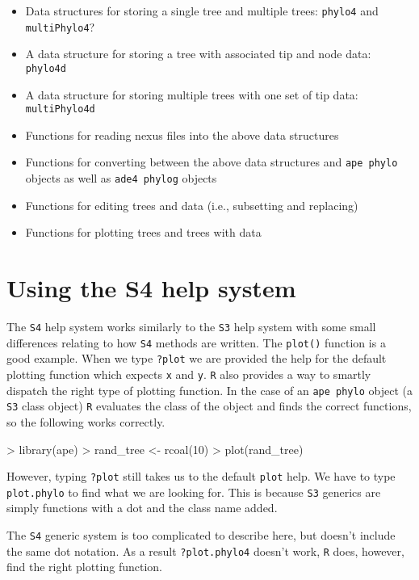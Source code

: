 \documentclass{article}
\newcommand{\code}[1]{{{\tt #1}}}
\begin{document}
\begin{itemize}
  \item Data structures for storing a single tree and multiple trees: \code{phylo4} and \code{multiPhylo4}?
  \item A data structure for storing a tree with associated tip and node data: \code{phylo4d}
  \item A data structure for storing multiple trees with one set of tip data: \code{multiPhylo4d}
  \item Functions for reading nexus files into the above data structures
  \item Functions for converting between the above data structures and \code{ape phylo} objects as well as \code{ade4 phylog} objects
  \item Functions for editing trees and data (i.e., subsetting and replacing)
  \item Functions for plotting trees and trees with data
\end{itemize}

\section{Using the S4 help system}

The \code{S4} help system works similarly to the \code{S3} help system with some small differences relating to how \code{S4} methods are written.  The \code{plot()} function is a good example.  When we type \code{?plot} we are provided the help for the default plotting function which expects \code{x} and \code{y}.  \code{R} also provides a way to smartly dispatch the right type of plotting function.  In the case of an \code{ape phylo} object (a \code{S3} class object) \code{R} evaluates the class of the object and finds the correct functions, so the following works correctly.

\begin{Schunk}
\begin{Sinput}
> library(ape)
> rand_tree <- rcoal(10)
> plot(rand_tree)
\end{Sinput}
\end{Schunk}

However, typing \code{?plot} still takes us to the default \code{plot} help.  We have to type \code{plot.phylo} to find what we are looking for.  This is because \code{S3} generics are simply functions with a dot and the class name added.  

The \code{S4} generic system is too complicated to describe here, but doesn't include the same dot notation.  As a result \code{?plot.phylo4} doesn't work, \code{R} does, however, find the right plotting function.
\end{document}
